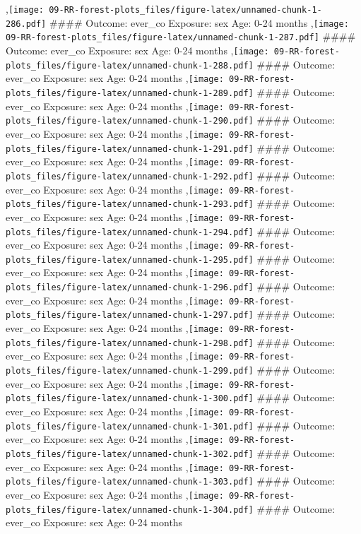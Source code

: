 \documentclass[
  9pt,
]{book}
\begin{document}
,\texttt{[image: 09-RR-forest-plots\_files/figure-latex/unnamed-chunk-1-286.pdf]}
\#\#\#\# Outcome: ever\_co Exposure: sex Age: 0-24 months
,\texttt{[image: 09-RR-forest-plots\_files/figure-latex/unnamed-chunk-1-287.pdf]}
\#\#\#\# Outcome: ever\_co Exposure: sex Age: 0-24 months
,\texttt{[image: 09-RR-forest-plots\_files/figure-latex/unnamed-chunk-1-288.pdf]}
\#\#\#\# Outcome: ever\_co Exposure: sex Age: 0-24 months
,\texttt{[image: 09-RR-forest-plots\_files/figure-latex/unnamed-chunk-1-289.pdf]}
\#\#\#\# Outcome: ever\_co Exposure: sex Age: 0-24 months
,\texttt{[image: 09-RR-forest-plots\_files/figure-latex/unnamed-chunk-1-290.pdf]}
\#\#\#\# Outcome: ever\_co Exposure: sex Age: 0-24 months
,\texttt{[image: 09-RR-forest-plots\_files/figure-latex/unnamed-chunk-1-291.pdf]}
\#\#\#\# Outcome: ever\_co Exposure: sex Age: 0-24 months
,\texttt{[image: 09-RR-forest-plots\_files/figure-latex/unnamed-chunk-1-292.pdf]}
\#\#\#\# Outcome: ever\_co Exposure: sex Age: 0-24 months
,\texttt{[image: 09-RR-forest-plots\_files/figure-latex/unnamed-chunk-1-293.pdf]}
\#\#\#\# Outcome: ever\_co Exposure: sex Age: 0-24 months
,\texttt{[image: 09-RR-forest-plots\_files/figure-latex/unnamed-chunk-1-294.pdf]}
\#\#\#\# Outcome: ever\_co Exposure: sex Age: 0-24 months
,\texttt{[image: 09-RR-forest-plots\_files/figure-latex/unnamed-chunk-1-295.pdf]}
\#\#\#\# Outcome: ever\_co Exposure: sex Age: 0-24 months
,\texttt{[image: 09-RR-forest-plots\_files/figure-latex/unnamed-chunk-1-296.pdf]}
\#\#\#\# Outcome: ever\_co Exposure: sex Age: 0-24 months
,\texttt{[image: 09-RR-forest-plots\_files/figure-latex/unnamed-chunk-1-297.pdf]}
\#\#\#\# Outcome: ever\_co Exposure: sex Age: 0-24 months
,\texttt{[image: 09-RR-forest-plots\_files/figure-latex/unnamed-chunk-1-298.pdf]}
\#\#\#\# Outcome: ever\_co Exposure: sex Age: 0-24 months
,\texttt{[image: 09-RR-forest-plots\_files/figure-latex/unnamed-chunk-1-299.pdf]}
\#\#\#\# Outcome: ever\_co Exposure: sex Age: 0-24 months
,\texttt{[image: 09-RR-forest-plots\_files/figure-latex/unnamed-chunk-1-300.pdf]}
\#\#\#\# Outcome: ever\_co Exposure: sex Age: 0-24 months
,\texttt{[image: 09-RR-forest-plots\_files/figure-latex/unnamed-chunk-1-301.pdf]}
\#\#\#\# Outcome: ever\_co Exposure: sex Age: 0-24 months
,\texttt{[image: 09-RR-forest-plots\_files/figure-latex/unnamed-chunk-1-302.pdf]}
\#\#\#\# Outcome: ever\_co Exposure: sex Age: 0-24 months
,\texttt{[image: 09-RR-forest-plots\_files/figure-latex/unnamed-chunk-1-303.pdf]}
\#\#\#\# Outcome: ever\_co Exposure: sex Age: 0-24 months
,\texttt{[image: 09-RR-forest-plots\_files/figure-latex/unnamed-chunk-1-304.pdf]}
\#\#\#\# Outcome: ever\_co Exposure: sex Age: 0-24 months
\end{document}
